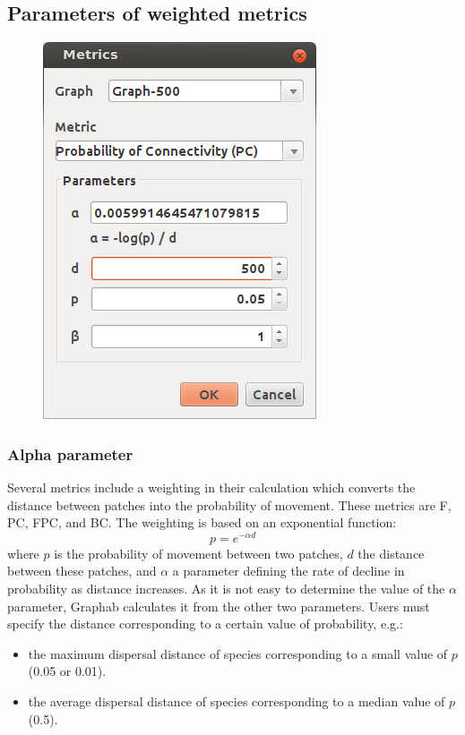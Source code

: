 \documentclass{article}
\begin{document}
\subsection{Parameters of weighted metrics}
\label{param_weight}

\begin{figure}[H]
	\includegraphics[scale=0.5]{img/manual-en_img10.png}
\end{figure}


\subsubsection{Alpha parameter}

Several metrics include a weighting in their calculation which converts the distance between patches into the probability of movement. These metrics are F, PC, FPC, and BC. The weighting is based on an exponential function:
\begin{equation*}
p={e}^{-\mathit{\alpha d}}
\end{equation*}
where $p$ is the probability of movement between two patches, $d$ the distance between these patches, and $\alpha$ a parameter defining the rate of decline in probability as distance increases. As it is not easy to determine the value of the $\alpha$ parameter, Graphab calculates it from the other two parameters. Users must specify the distance corresponding to a certain value of probability, e.g.:
\begin{itemize}
	\item the maximum dispersal distance of species corresponding to a small value of $p$ (0.05 or 0.01).
	\item the average dispersal distance of species corresponding to a median value of $p$ (0.5).
\end{itemize}
\end{document}
